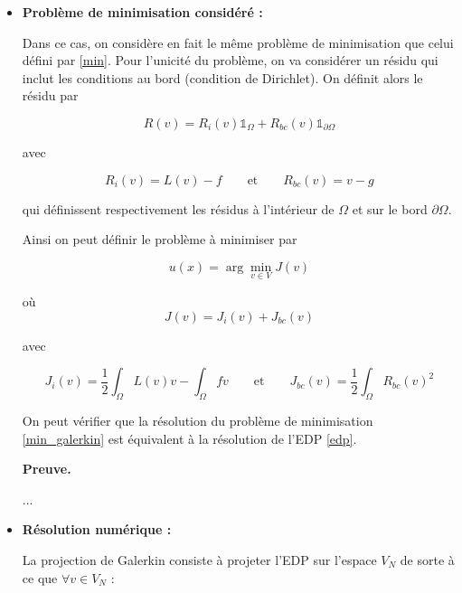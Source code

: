 \documentclass[french]{article}
\newenvironment{preuve}[1][]{\begin{tcolorbox}[
	colback=white, %
	colframe=green!70!black, %
	arc=2mm, %
	boxrule=1pt, %
	breakable, enhanced jigsaw
	]
	\textcolor{green!70!black}{\textbf{Preuve.} \\}

	#1
}{\end{tcolorbox}}
\begin{document}
	\begin{itemize}[label=]
		\item \textbf{Problème de minimisation considéré :}
		
		Dans ce cas, on considère en fait le même problème de minimisation que celui défini par \eqref{min}. Pour l'unicité du problème, on va considérer un résidu qui inclut les conditions au bord (condition de Dirichlet). On définit alors le résidu par
		
		\begin{equation*}
			R(v) = R_i(v)\mathbb{1}_{\Omega} + R_{bc}(v)\mathbb{1}_{\partial \Omega}
		\end{equation*}
	
		avec 
		
		\begin{equation*}
			R_i(v)=L(v) - f \qquad \text{et} \qquad R_{bc}(v)=v-g
		\end{equation*}
		
		qui définissent respectivement les résidus à l'intérieur de $\Omega$ et sur le bord $\partial\Omega$. 
		
		Ainsi on peut définir le problème à minimiser par

		\begin{equation}
			u(x)=\arg\min_{v \in V}J(v) \label{min_galerkin}
		\end{equation}
	
		où
		\begin{equation*}
			J(v)=J_i(v)+J_{bc}(v) 
		\end{equation*}
		
		avec 
		
		\begin{equation*}
			J_i(v)=\frac{1}{2}\int_\Omega L(v)v - \int_\Omega fv  \qquad \text{et} \qquad J_{bc}(v)=\frac{1}{2}\int_\Omega R_{bc}(v)^2
		\end{equation*}

		On peut vérifier que la résolution du problème de minimisation \eqref{min_galerkin} est équivalent à la résolution de l'EDP \eqref{edp}.
		
		\begin{preuve}
...
		\end{preuve}
		
		\item \textbf{Résolution numérique :}
		
		La projection de Galerkin consiste à projeter l'EDP sur l'espace $V_N$ de sorte à ce que $\forall v \in V_N$ :
		

\end{itemize}
\end{document}
